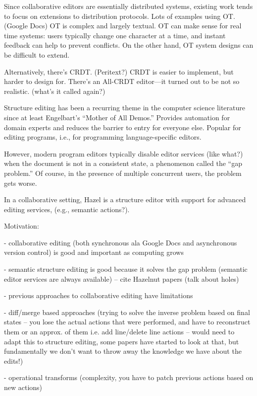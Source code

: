 Since collaborative editors are essentially distributed systems, existing work tends to focus on extensions to distribution protocols.
Lots of examples using OT. (Google Docs)
OT is complex and largely textual.
OT can make sense for real time systems: users typically change one character at a time, and instant feedback can help to prevent conflicts.
On the other hand, OT system designs can be difficult to extend.

Alternatively, there's CRDT. (Peritext?)
CRDT is easier to implement, but harder to design for.
There's an All-CRDT editor---it turned out to be not so realistic. (what's it called again?)

Structure editing has been a recurring theme in the computer science literature since at least Engelbart's ``Mother of All Demos.''
Provides automation for domain experts and reduces the barrier to entry for everyone else.
Popular for editing programs, i.e., for programming language-specific editors.

However, modern program editors typically disable editor services (like what?) when the document is not in a consistent state,
a phenomenon called the ``gap problem.''
Of course, in the presence of multiple concurrent users, the problem gets worse.

In a collaborative setting,
Hazel is a structure editor with support for advanced editing services, (e.g., semantic actions?).

\newpage




Motivation:

- collaborative editing (both synchronous ala Google Docs and asynchronous version control)
is good and important as computing grows

- semantic structure editing is good because it solves the gap problem (semantic editor services
are always available) -- cite Hazelnut papers (talk about holes)

- previous approaches to collaborative editing have limitations

- diff/merge based approaches (trying to solve the inverse problem based on final states --
you lose the actual actions that were performed, and have to reconstruct them or an approx.
of them i.e. add line/delete line actions -- would need to adapt this to structure editing,
some papers have started to look at that, but fundamentally we don't want to throw away the
knowledge we have about the edits!)

- operational transforms (complexity, you have to patch previous actions based on new actions)

